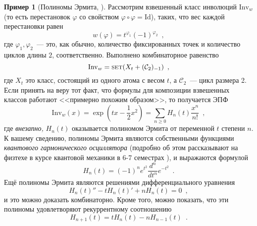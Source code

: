 \documentclass[a5paper]{article}
\theoremstyle{definition}
\newtheorem{example}{Пример}
\begin{document}
\begin{example}[Полиномы Эрмита, {\cite[Example 16, page 89]{species}}]
    Рассмотрим взвешенный класс инволюций \( \mathrm{Inv}_w \) (то есть
перестановок \( \varphi \) со свойством \( \varphi \circ \varphi = \mathrm{Id}
\)), таких, что вес каждой перестановки равен
\[
    w(\varphi) = t^{\varphi_1} (-1)^{\varphi_2} \enspace ,
\]
где \( \varphi_1, \varphi_2 \)~--- это, как обычно, количество фиксированных
точек и количество циклов длины \( 2 \), соответственно. Выполнено комбинаторное
равенство
\[
    \mathrm{Inv}_w = \text{\textsc{set}}(X_t + (\mathcal C_2)_{-1}) \enspace ,
\]
где \( X_t \) это класс, состоящий из одного атома с весом \( t \), а \(
\mathcal C_2 \)~--- цикл размера 2. Если принять на веру тот факт, что формулы
для композиции взвешенных классов работают <<примерно похожим образом>>, то
получается ЭПФ
\[
    \mathrm{Inv}_w(x) = \exp \left(
        tx - \dfrac12 x^2
    \right) = \sum_{n \geq 0} H_n(t) \dfrac{x^n}{n!} \enspace ,
\]
где \textit{внезапно,} \( H_n(t) \) оказывается полиномом Эрмита от переменной \( t \)
степени \( n \). К вашему сведению, полиномы Эрмита являются собственными
функциями \textit{квантового гармонического осциллятора} (подробно об этом
рассказывают на физтехе в курсе квантовой механики в 6-7 семестрах
\cite[section 4.1]{mipt-quantum}), и выражаются
формулой
\[  
    H_n(t) = (-1)^n e^{t^2} \dfrac{d^n}{dt^n} e^{-t^2}
    \enspace .
\]
Ещё полиномы Эрмита являются решениями дифференциального уравнения
\[
    H_n(t)'' - t H_n(t)' + n H_n(t) = 0 \enspace ,
\]
и это можно доказать комбинаторно. Кроме того, можно показать, что эти полиномы
удовлетворяют рекуррентному соотношению
\[
    H_{n+1} (t) = t H_n(t) - n H_{n-1}(t) \enspace .
\]
\end{example}
\end{document}
